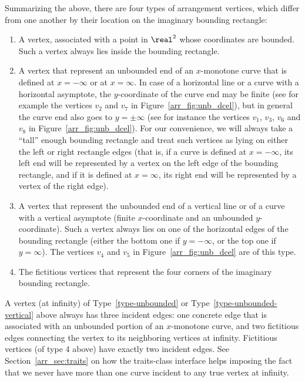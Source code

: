 \begin{ccAdvanced}
Summarizing the above, there are four types of arrangement vertices,
which differ from one another by their location on the imaginary
bounding rectangle:
\begin{enumerate}
\item\label{type-normal}
  A vertex, associated with a point in $\real^2$ whose
  coordinates are bounded. Such a vertex always lies inside the
  bounding rectangle.
\item\label{type-unbounded}
  A vertex that represent an unbounded end of an $x$-monotone curve
  that is defined at $x = -\infty$ or at $x = \infty$. In case of
  a horizontal line or a curve with a horizontal asymptote, the
  $y$-coordinate of the curve end may be finite (see for example the
  vertices $v_2$ and $v_7$ in Figure~\ref{arr_fig:unb_dcel}), but in
  general the curve end also goes to $y = \pm\infty$ (see for instance
  the vertices $v_1$, $v_3$, $v_6$ and $v_8$ in
  Figure~\ref{arr_fig:unb_dcel}). For our convenience, we will always
  take a ``tall'' enough bounding rectangle and treat such vertices as
  lying on either the left or right rectangle edges (that is, if a curve
  is defined at $x = -\infty$, its left end will be represented by
  a vertex on the left edge of the bounding rectangle, and if it is
  defined at $x = \infty$, its right end will be represented by a
  vertex of the right edge).
\item\label{type-unbounded-vertical}
  A vertex that represent the unbounded end of a vertical line or of a
  curve with a vertical asymptote (finite $x$-coordinate and an
  unbounded $y$-coordinate). Such a vertex always lies on one of the
  horizontal edges of the bounding rectangle (either the bottom one if
  $y = -\infty$, or the top one if $y = \infty$). The vertices $v_4$ 
  and $v_5$ in Figure~\ref{arr_fig:unb_dcel} are of this type.
\item\label{type-fictitious}
  The fictitious vertices that represent the four corners of the
  imaginary bounding rectangle.
\end{enumerate}
A vertex (at infinity) of Type~\ref{type-unbounded} or
Type~\ref{type-unbounded-vertical} above always has
three incident edges: one concrete edge that is associated with an
unbounded portion of an $x$-monotone curve, and two fictitious edges
connecting the vertex to its neighboring vertices at infinity.
Fictitious vertices (of type 4 above) have exactly two incident edges.
See Section~\ref{arr_sec:traits} on how the traits-class interface
helps imposing the fact that we never have more than one curve
incident to any true vertex at infinity.


\end{ccAdvanced}
